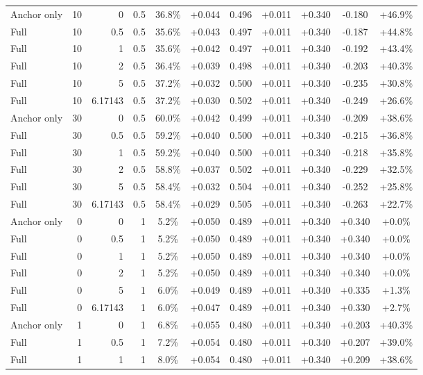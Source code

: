 \begin{table}[htbp]
\begin{tabular}{lrrrccccccc}
Anchor only & 10 & 0 & 0.5 & 36.8\% & +0.044 & 0.496 & +0.011 & +0.340 & -0.180 & +46.9\% \\
Full & 10 & 0.5 & 0.5 & 35.6\% & +0.043 & 0.497 & +0.011 & +0.340 & -0.187 & +44.8\% \\
Full & 10 & 1 & 0.5 & 35.6\% & +0.042 & 0.497 & +0.011 & +0.340 & -0.192 & +43.4\% \\
Full & 10 & 2 & 0.5 & 36.4\% & +0.039 & 0.498 & +0.011 & +0.340 & -0.203 & +40.3\% \\
Full & 10 & 5 & 0.5 & 37.2\% & +0.032 & 0.500 & +0.011 & +0.340 & -0.235 & +30.8\% \\
Full & 10 & 6.17143 & 0.5 & 37.2\% & +0.030 & 0.502 & +0.011 & +0.340 & -0.249 & +26.6\% \\
Anchor only & 30 & 0 & 0.5 & 60.0\% & +0.042 & 0.499 & +0.011 & +0.340 & -0.209 & +38.6\% \\
Full & 30 & 0.5 & 0.5 & 59.2\% & +0.040 & 0.500 & +0.011 & +0.340 & -0.215 & +36.8\% \\
Full & 30 & 1 & 0.5 & 59.2\% & +0.040 & 0.500 & +0.011 & +0.340 & -0.218 & +35.8\% \\
Full & 30 & 2 & 0.5 & 58.8\% & +0.037 & 0.502 & +0.011 & +0.340 & -0.229 & +32.5\% \\
Full & 30 & 5 & 0.5 & 58.4\% & +0.032 & 0.504 & +0.011 & +0.340 & -0.252 & +25.8\% \\
Full & 30 & 6.17143 & 0.5 & 58.4\% & +0.029 & 0.505 & +0.011 & +0.340 & -0.263 & +22.7\% \\
Anchor only & 0 & 0 & 1 & 5.2\% & +0.050 & 0.489 & +0.011 & +0.340 & +0.340 & +0.0\% \\
Full & 0 & 0.5 & 1 & 5.2\% & +0.050 & 0.489 & +0.011 & +0.340 & +0.340 & +0.0\% \\
Full & 0 & 1 & 1 & 5.2\% & +0.050 & 0.489 & +0.011 & +0.340 & +0.340 & +0.0\% \\
Full & 0 & 2 & 1 & 5.2\% & +0.050 & 0.489 & +0.011 & +0.340 & +0.340 & +0.0\% \\
Full & 0 & 5 & 1 & 6.0\% & +0.049 & 0.489 & +0.011 & +0.340 & +0.335 & +1.3\% \\
Full & 0 & 6.17143 & 1 & 6.0\% & +0.047 & 0.489 & +0.011 & +0.340 & +0.330 & +2.7\% \\
Anchor only & 1 & 0 & 1 & 6.8\% & +0.055 & 0.480 & +0.011 & +0.340 & +0.203 & +40.3\% \\
Full & 1 & 0.5 & 1 & 7.2\% & +0.054 & 0.480 & +0.011 & +0.340 & +0.207 & +39.0\% \\
Full & 1 & 1 & 1 & 8.0\% & +0.054 & 0.480 & +0.011 & +0.340 & +0.209 & +38.6\% \\

\end{tabular}
\end{table}
